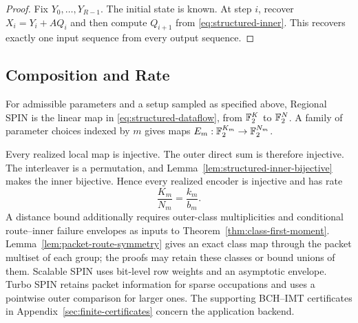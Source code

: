 \begin{proof}
Fix $Y_0,\ldots,Y_{R-1}$. The initial state is known. At step $i$,
recover $X_i=Y_i+A Q_i$ and then compute $Q_{i+1}$ from
\eqref{eq:structured-inner}. This recovers exactly one input sequence
from every output sequence.
\end{proof}

\subsection{Composition and Rate}

\begin{definition}
\label{def:structured-spin}
For admissible parameters and a setup sampled as specified above,
Regional SPIN is the linear map in \eqref{eq:structured-dataflow}, from
$\mathbb F_2^{K}$ to $\mathbb F_2^{N}$. A family of parameter choices indexed by $m$
gives maps $E_m:\mathbb F_2^{K_m}\to\mathbb F_2^{N_m}$.
\end{definition}

Every realized local map is injective. The outer direct sum is therefore
injective. The interleaver is a permutation, and
Lemma~\ref{lem:structured-inner-bijective} makes the inner bijective. Hence
every realized encoder is injective and has rate
\begin{equation}
  \frac{K_m}{N_m}=\frac{k_m}{b_m}.
  \label{eq:structured-spin-rate}
\end{equation}
A distance bound additionally requires outer-class multiplicities and
conditional route--inner failure envelopes as inputs to
Theorem~\ref{thm:class-first-moment}. Lemma~\ref{lem:packet-route-symmetry}
gives an exact class map through the packet multiset of each group;
the proofs may retain these classes or bound unions of them. Scalable SPIN
uses bit-level row weights and an asymptotic envelope. Turbo SPIN retains
packet information for sparse occupations and uses a pointwise outer
comparison for larger ones. The supporting BCH--IMT certificates in
Appendix~\ref{sec:finite-certificates} concern the application backend.
